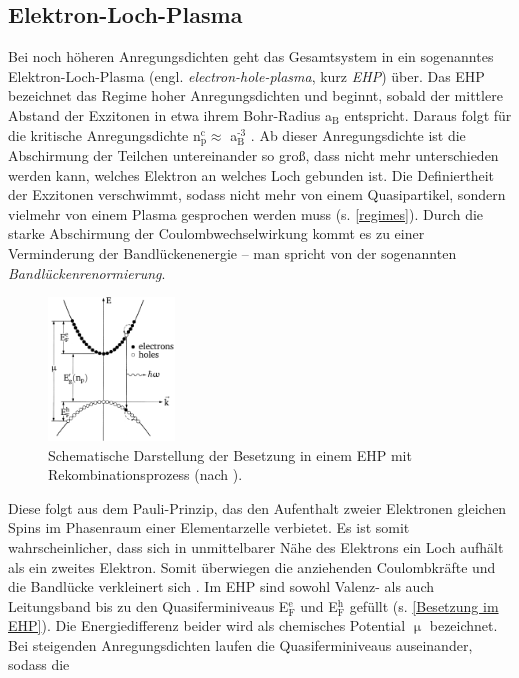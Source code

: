 \subsection{Elektron-Loch-Plasma} \label{EHP} Bei noch höheren Anregungsdichten
geht das Gesamtsystem in ein sogenanntes Elektron-Loch-Plasma (engl.
\textit{electron-hole-plasma}, kurz \textit{EHP}) über. Das EHP bezeichnet das
Regime hoher Anregungsdichten und beginnt, sobald der mittlere Abstand der
Exzitonen in etwa ihrem Bohr-Radius a$_\text{B}$ entspricht. Daraus folgt für
die kritische Anregungsdichte n$_\text{p}^\text{c}\approx$
a$_\text{B}^\text{-3}$ \cite{Klingshirn.2007}. Ab dieser Anregungsdichte ist die
Abschirmung der Teilchen untereinander so groß, dass nicht mehr unterschieden
werden kann, welches Elektron an welches Loch gebunden ist. Die Definiertheit
der Exzitonen verschwimmt, sodass nicht mehr von einem Quasipartikel, sondern
vielmehr von einem Plasma gesprochen werden muss (s. \autoref{regimes}). Durch
die starke Abschirmung der Coulombwechselwirkung kommt es zu einer Verminderung
der Bandlückenenergie – man spricht von der sogenannten
\textit{Bandlückenrenormierung}.\begin{figure}[b] \centering
\includegraphics[width=0.3\textwidth]{Bilder/Vorbetrachtung/ehp}
\caption[Besetzung im EHP]{Schematische Darstellung der Besetzung in einem EHP
mit Rekombinationsprozess (nach \cite{Klingshirn.2007}).} \label{Besetzung im
EHP} \end{figure} Diese folgt aus dem Pauli-Prinzip, das den Aufenthalt zweier
Elektronen gleichen Spins im Phasenraum einer Elementarzelle verbietet. Es ist
somit wahrscheinlicher, dass sich in unmittelbarer Nähe des Elektrons ein Loch
aufhält als ein zweites Elektron. Somit überwiegen die anziehenden Coulombkräfte
und die Bandlücke verkleinert sich \cite{Klingshirn.2007}. Im EHP sind sowohl
Valenz- als auch Leitungsband bis zu den Quasiferminiveaus E$_\text{F}^\text{e}$
und E$_\text{F}^\text{h}$ gefüllt (s. \autoref {Besetzung im EHP}). Die
Energiedifferenz beider wird als chemisches Potential $\upmu$ bezeichnet. Bei
steigenden Anregungsdichten laufen die Quasiferminiveaus auseinander, sodass die
